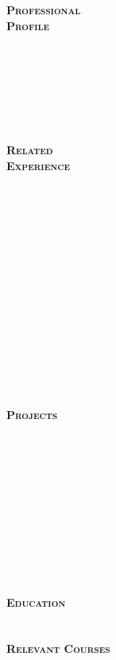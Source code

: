 \documentclass[10pt]{article}
\begin{document}
\begin{minipage}[t]{0.16\linewidth} 
	\textbf{\textsc{
	\hspace{-5pt}Professional\\Profile \\ \\ \\ \\ \\ \\ \\ \\ 
	Related\\Experience \\ \\ \\ \\ \\ \\ \\ \\ \\ \\ \\ \\ \\ \\ \\ \\
	Projects \\ \\ \\ \\ \\ \\ \\ \\ \\ \\ \\ \\
	Education \\ \\ \\ 
	Relevant Courses
	}}
\end{minipage}
\end{document}
